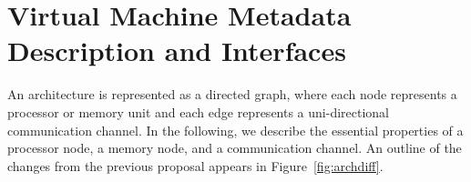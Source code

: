\newcommand{\taba}[1]{\parbox{2.4in}{ ~ \vspace{-0pt} \\ #1 \vspace{-6pt} \\ }}
\newcommand{\tabb}[1]{\parbox{3.6in}{ ~ \vspace{-0pt} \\ #1 \vspace{-6pt} \\ }}
\newcommand{\mytable}[2]{
  {\small
    \begin{tabular}{|l|l|} \hline
      Attribute Name & #1 \\
      \hline \hline
      #2
    \end{tabular}
  }
}
\newcommand{\enttable}[1]{\mytable{Type - Units / Interpretation}{#1}}
\newcommand{\sumtable}[1]{\mytable{Summary}{#1}}
\newcommand{\justtable}[1]{\mytable{Summary and Justification}{#1}}
\newcommand{\entry}[3]{\taba{#1} & \tabb{#2 \\ #3} \\ \hline}
\newcommand{\summary}[2]{\taba{#1} & \tabb{#2} \\ \hline}
\newcommand{\just}[3]{\taba{#1} & \tabb{#2 \\ {\it #3}} \\ \hline}

\section{Virtual Machine Metadata Description and Interfaces}

An architecture is represented as a directed graph, where each node
represents a processor or memory unit and each edge represents a
uni-directional communication channel.  In the following, we describe
the essential properties of a processor node, a memory node, and a
communication channel.  An outline of the changes from the previous
proposal appears in Figure~\ref{fig:archdiff}.

